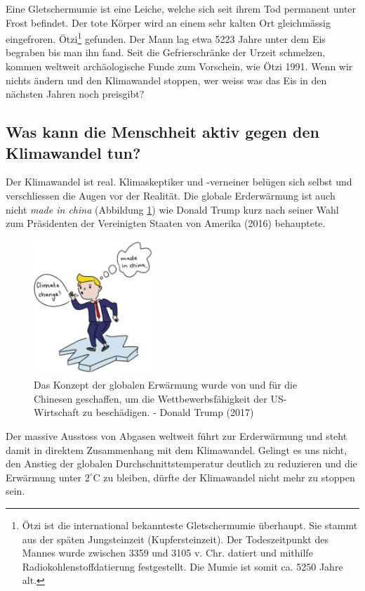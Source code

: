 \begin{refsection}
{Eine Gletschermumie ist eine Leiche, welche sich seit ihrem Tod permanent unter Frost befindet. Der tote Körper wird an einem sehr kalten Ort gleichmässig eingefroren.}
Ötzi\footnote{%
Ötzi ist die international bekannteste Gletschermumie überhaupt. Sie stammt aus der späten Jungsteinzeit (Kupfersteinzeit). Der Todeszeitpunkt des Mannes wurde zwischen 3359 und 3105 v. Chr. datiert und mithilfe Radiokohlenstoffdatierung festgestellt. Die Mumie ist somit ca. 5250 Jahre alt.}
gefunden. Der Mann lag etwa 5223 Jahre unter dem Eis begraben bis man ihn fand. Seit die Gefrierschränke der Urzeit schmelzen, kommen weltweit archäologische Funde zum Vorschein, wie Ötzi 1991. Wenn wir nichts ändern und den Klimawandel stoppen, wer weiss was das Eis in den nächsten Jahren noch preisgibt?


\subsection{Was kann die Menschheit aktiv gegen den Klimawandel tun?}
Der Klimawandel ist real. Klimaskeptiker und -verneiner belügen sich selbst und verschliessen die Augen vor der Realität. Die globale Erderwärmung ist auch nicht \textit{made in china} (Abbildung \ref{DTrump}) wie Donald Trump kurz nach seiner Wahl zum Präsidenten der Vereinigten Staaten von Amerika (2016) behauptete.

\begin{figure}
\centering
\includegraphics[width=0.4\textwidth]{extrem/Trump.pdf}
\caption{Das Konzept der globalen Erwärmung wurde von und für die Chinesen geschaffen, um die Wettbewerbsfähigkeit der US-Wirtschaft zu beschädigen. - Donald Trump (2017)}
\label{DTrump}
\end{figure}

Der massive Ausstoss von Abgasen weltweit führt zur Erderwärmung und steht damit in direktem Zusammenhang mit dem Klimawandel. Gelingt es uns nicht, den Anstieg der globalen Durchschnittstemperatur deutlich zu reduzieren und die Erwärmung unter $2^{\circ}$C zu bleiben, dürfte der Klimawandel nicht mehr zu stoppen sein.


\end{refsection}
